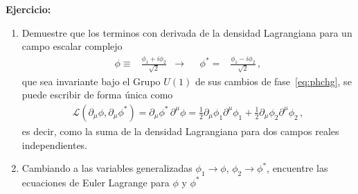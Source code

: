 \begin{frame}
\textbf{Ejercicio:}
\begin{enumerate}
\item  Demuestre que los terminos con derivada de la densidad Lagrangiana para un campo escalar complejo
\begin{align}
  \phi\equiv&\frac{\phi_1+i\phi_2}{\sqrt{2}} &\to&&   \phi^{*}=&\frac{\phi_1-i\phi_2}{\sqrt{2}}\,,
\end{align}
que sea invariante bajo el Grupo $U(1)$ de sus cambios de fase~\eqref{eq:phchg}, se puede escribir de forma única como
\begin{align}
  \mathcal{L}(\partial_{\mu} \phi,\partial_{\mu} \phi^{*})=  {\partial_\mu\phi^{*}}\,{\partial^\mu\phi}=\frac{1}{2}\partial_{\mu}\phi_1 \partial^{\mu}\phi_1+\frac{1}{2}\partial_{\mu}\phi_2 \partial^{\mu}\phi_2\,,
\end{align}
es decir, como la suma de la densidad Lagrangiana para dos campos reales independientes.
\item Cambiando a las variables generalizadas $\phi_1\to \phi$, $\phi_2\to \phi^{*}$, encuentre las ecuaciones de Euler Lagrange para $\phi$ y $\phi^{*}$
\end{enumerate}
\end{frame}





